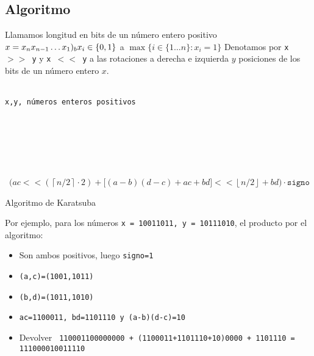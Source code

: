 \documentclass[a4paper, 11pt]{article} %
\begin{document}
\subsection{Algoritmo}
Llamamos longitud en bits de un número entero positivo $x=x_{n}x_{n-1}\ldots x_1)_b \quad \\ x_i \in \{0,1\}$
a $\max\{i\in \{1\ldots n\} : x_i = 1\}$
Denotamos por \texttt{x $>>$ y} y \texttt{x $<<$ y} a las rotaciones a derecha e izquierda $y$ posiciones
de los bits de un número entero $x$.
\begin{algorithm}[H]
	\begin{algorithmic}[1]
	  \REQUIRE \ \\
	  \texttt{x,y, números enteros positivos}\\\
        	
	  \IF{[x<0 \AND y<0] \OR [x>0 \AND y>0]}
	  \ELSE
	  \ENDIF\\\
	  \\\
	  \IF{\texttt{longitud} $<$ 2}
	  \ELSE
	  \ENDIF \\\
	  \RETURN\\\ $\bigg( ac << (\left\lceil n/2 \right\rceil \cdot 2) +
	    \bigg[(a-b)(d-c) +ac +bd\bigg] << \left\lfloor n/2\right\rfloor + 
	    bd \bigg) \cdot \texttt{signo}$
	  
	\end{algorithmic}
    \caption{Algoritmo de Karatsuba}
    \label{multiplicacion}
\end{algorithm}
\newpage
Por ejemplo, para los números \texttt{x = 10011011, y = 10111010}, el producto por el algoritmo:
\begin{itemize}
\item Son ambos positivos, luego \texttt{signo=1}
\item \texttt{(a,c)=(1001,1011)}
\item \texttt{(b,d)=(1011,1010)}
\item \texttt{ac=1100011, bd=1101110 y (a-b)(d-c)=10}
\item Devolver \texttt{ 110001100000000 + (1100011+1101110+10)0000 + 1101110 = 111000010011110}
\end{itemize} 
\end{document}
